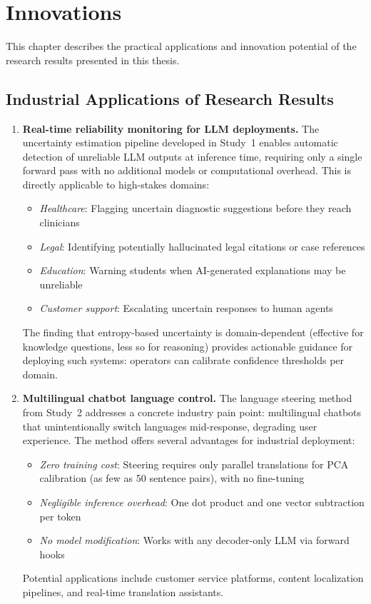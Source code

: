 \chapter*{Innovations}

This chapter describes the practical applications and innovation potential of the research results presented in this thesis.

\section*{Industrial Applications of Research Results}

\begin{enumerate}
    \item \textbf{Real-time reliability monitoring for LLM deployments.} The uncertainty estimation pipeline developed in Study~1 enables automatic detection of unreliable LLM outputs at inference time, requiring only a single forward pass with no additional models or computational overhead. This is directly applicable to high-stakes domains:
    \begin{itemize}
        \item \textit{Healthcare}: Flagging uncertain diagnostic suggestions before they reach clinicians
        \item \textit{Legal}: Identifying potentially hallucinated legal citations or case references
        \item \textit{Education}: Warning students when AI-generated explanations may be unreliable
        \item \textit{Customer support}: Escalating uncertain responses to human agents
    \end{itemize}
    The finding that entropy-based uncertainty is domain-dependent (effective for knowledge questions, less so for reasoning) provides actionable guidance for deploying such systems: operators can calibrate confidence thresholds per domain.

    \item \textbf{Multilingual chatbot language control.} The language steering method from Study~2 addresses a concrete industry pain point: multilingual chatbots that unintentionally switch languages mid-response, degrading user experience. The method offers several advantages for industrial deployment:
    \begin{itemize}
        \item \textit{Zero training cost}: Steering requires only parallel translations for PCA calibration (as few as 50 sentence pairs), with no fine-tuning
        \item \textit{Negligible inference overhead}: One dot product and one vector subtraction per token
        \item \textit{No model modification}: Works with any decoder-only LLM via forward hooks
    \end{itemize}
    Potential applications include customer service platforms, content localization pipelines, and real-time translation assistants.


\end{enumerate}
